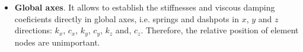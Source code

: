 \documentclass[a4paper,fleqn]{book}
\begin{document}
\begin{itemize}
\begin{equation}
\begin{array}{cccccc}
    0      & 0      & c_{z'} &       0 &       0 & -c_{z'} \\
    -c_{x'} &       0 & 0       & c_{x'} &      0 & 0 \\
        0 & -c_{y'} & 0       &      0 & c_{y'} & 0 \\
        0 &       0 & -c_{z'} &      0 &      0 & c_{z'}
    \end{array}
    \right]
    \end{equation}
    In this latter case, in order to uniquely define the local axis, a reference vector $\mathbf{y}'_\mathrm{ref}$ is required for establishing the local $y'$ axis, see Figures \ref{fig:local_axes_yref_2d} and \ref{fig:distra} for more details.
    
    \item \textbf{Global axes}. It allows to establish the stiffnesses and viscous damping coeficients directly in global axes, i.e. springs and dashpots in $x$, $y$ and $z$ directions: $k_{x}$, $c_{x}$, $k_{y}$, $c_{y}$, $k_{z}$ and, $c_{z}$. Therefore, the relative position of element nodes are unimportant.
    
\end{itemize}
\end{document}
